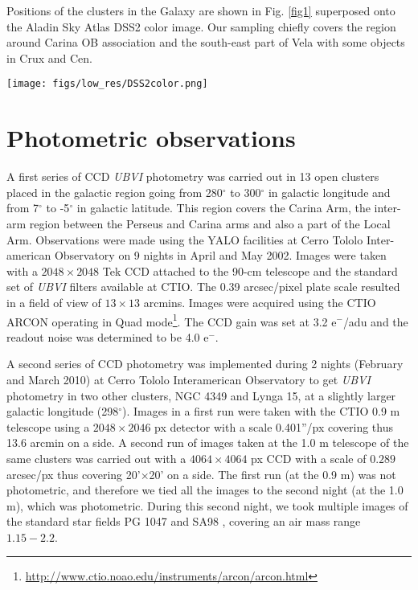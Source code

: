 \documentclass{aa}
\begin{document}
Positions of the clusters in the Galaxy are shown in Fig. \ref{fig1} superposed
onto the Aladin Sky Atlas DSS2 color image. Our sampling chiefly covers the
region around Carina OB association and the south-east part of Vela with some
objects in Crux and Cen.

\begin{figure*}[ht]
    \centering
    \texttt{[image: figs/low\_res/DSS2color.png]}
    \caption{DSS2 color Aladin image showing with white circles the position of
    the clusters surveyed in the present sample. The galactic coordinates $l$
    and $b$ are depicted by a green grid while constellation limits for Carina,
    Vela, Centaurus and Crux appear in yellow lines.}
    \label{fig1}
\end{figure*}




\section{Photometric observations}
\label{sec:photo_obs}

A first series of CCD \emph{UBVI} photometry was carried out in 13 open clusters
placed in the galactic region going from 280$^\circ$ to 300$^\circ$ in galactic
longitude and from 7$^\circ$ to -5$^\circ$ in galactic latitude. This region
covers the Carina Arm, the inter-arm region between the Perseus and Carina arms
and also a part of the Local Arm.
Observations were made using the YALO facilities at Cerro Tololo Inter-american
Observatory on 9 nights in April and May 2002. Images were taken with a
$2048\times2048$ Tek CCD attached to the 90-cm telescope and the standard set of
\textit{UBVI} filters available at CTIO. The 0.39 arcsec/pixel plate scale
resulted in a field of view of $13\times13$ arcmins. Images were acquired using
the CTIO ARCON operating in Quad
mode\footnote{\url{http://www.ctio.noao.edu/instruments/arcon/arcon.html}}. The
CCD gain was set at 3.2 e$^-$/adu and the readout noise was determined to be 4.0
e$^-$.

A second series of CCD photometry was implemented during 2 nights (February and
March 2010) at Cerro Tololo Interamerican Observatory to get \textit{UBVI}
photometry in two other clusters, NGC 4349 and Lynga 15, at a slightly larger
galactic longitude (298$^\circ$). Images in a first run were taken with the CTIO
0.9 m telescope using a $2048\times2046$ px detector with a scale 0.401”/px
covering thus 13.6 arcmin on a side. A second run of images taken at the 1.0 m
telescope of the same clusters was carried out with a $4064\times4064$ px CCD
with a scale of $0.289$ arcsec/px thus covering 20'$\times$20' on a side.
%
The first run (at the 0.9 m) was not photometric, and therefore we tied all
the images to the second night (at the 1.0 m), which was photometric. During
this second night, we took multiple images of the standard star fields PG 1047
and SA98 \citep{1992AJ....104..340L}, covering an air mass range $1.15-2.2$.
\end{document}
